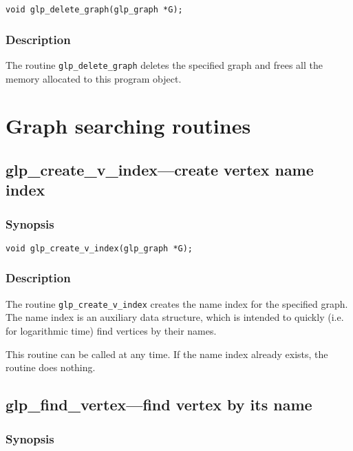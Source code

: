 \begin{verbatim}
void glp_delete_graph(glp_graph *G);
\end{verbatim}

\subsubsection*{Description}

The routine \verb|glp_delete_graph| deletes the specified graph and
frees all the memory allocated to this program object.

\newpage

\section{Graph searching routines}

\subsection{glp\_create\_v\_index---create vertex name index}

\subsubsection*{Synopsis}

\begin{verbatim}
void glp_create_v_index(glp_graph *G);
\end{verbatim}

\subsubsection*{Description}

The routine \verb|glp_create_v_index| creates the name index for the
specified graph. The name index is an auxiliary data structure, which
is intended to quickly (i.e. for logarithmic time) find vertices by
their names.

This routine can be called at any time. If the name index already
exists, the routine does nothing.

\subsection{glp\_find\_vertex---find vertex by its name}

\subsubsection*{Synopsis}

